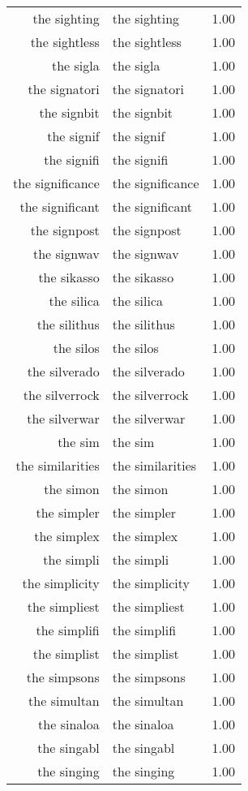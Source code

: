 \begin{table}[ht]
\begin{tabular}{rlr}
  the sighting & the sighting & 1.00 \\ 
  the sightless & the sightless & 1.00 \\ 
  the sigla & the sigla & 1.00 \\ 
  the signatori & the signatori & 1.00 \\ 
  the signbit & the signbit & 1.00 \\ 
  the signif & the signif & 1.00 \\ 
  the signifi & the signifi & 1.00 \\ 
  the significance & the significance & 1.00 \\ 
  the significant & the significant & 1.00 \\ 
  the signpost & the signpost & 1.00 \\ 
  the signwav & the signwav & 1.00 \\ 
  the sikasso & the sikasso & 1.00 \\ 
  the silica & the silica & 1.00 \\ 
  the silithus & the silithus & 1.00 \\ 
  the silos & the silos & 1.00 \\ 
  the silverado & the silverado & 1.00 \\ 
  the silverrock & the silverrock & 1.00 \\ 
  the silverwar & the silverwar & 1.00 \\ 
  the sim & the sim & 1.00 \\ 
  the similarities & the similarities & 1.00 \\ 
  the simon & the simon & 1.00 \\ 
  the simpler & the simpler & 1.00 \\ 
  the simplex & the simplex & 1.00 \\ 
  the simpli & the simpli & 1.00 \\ 
  the simplicity & the simplicity & 1.00 \\ 
  the simpliest & the simpliest & 1.00 \\ 
  the simplifi & the simplifi & 1.00 \\ 
  the simplist & the simplist & 1.00 \\ 
  the simpsons & the simpsons & 1.00 \\ 
  the simultan & the simultan & 1.00 \\ 
  the sinaloa & the sinaloa & 1.00 \\ 
  the singabl & the singabl & 1.00 \\ 
  the singing & the singing & 1.00 \\ 

\end{tabular}
\end{table}
